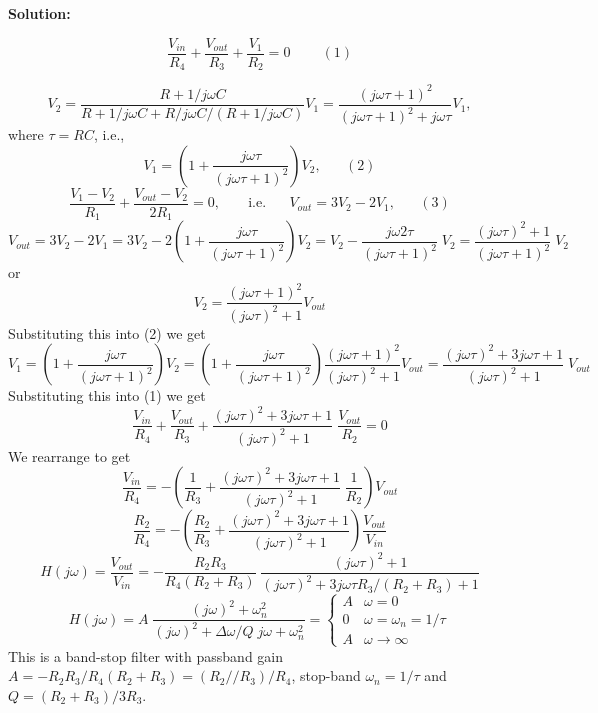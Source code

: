 \begin{enumerate}
  {\bf Solution:}

  \[
  \frac{V_{in}}{R_4}+\frac{V_{out}}{R_3}+\frac{V_1}{R_2}=0\;\;\;\;\;\;\;\;(1)
  \]

  \[
  V_2=\frac{R+1/j\omega C}{R+1/j\omega C+R/j\omega C/(R+1/j\omega C)}V_1
  =\frac{(j\omega\tau+1)^2}{(j\omega\tau+1)^2+j\omega\tau}V_1,
  \]
  where $\tau=RC$, i.e., 
  \[
  V_1=\left(1+\frac{j\omega\tau}{(j\omega\tau+1)^2}\right)V_2,\;\;\;\;\;\;(2)
  \]
  \[
  \frac{V_1-V_2}{R_1}+\frac{V_{out}-V_2}{2R_1}=0,
  \;\;\;\;\;\;\;\mbox{i.e.}\;\;\;\;\;\; V_{out}=3V_2-2V_1,\;\;\;\;\;\;(3)
  \]
  \[
  V_{out}=3V_2-2V_1=3V_2-2\left(1+\frac{j\omega\tau}{(j\omega\tau+1)^2}\right)V_2
  =V_2-\frac{j\omega 2\tau}{(j\omega\tau+1)^2}\;V_2
  =\frac{(j\omega\tau)^2+1}{(j\omega\tau+1)^2}\;V_2
  \]
  or 
  \[
  V_2=\frac{(j\omega\tau+1)^2}{(j\omega\tau)^2+1}V_{out}
  \]
  Substituting this into (2) we get 
  \[
  V_1=\left(1+\frac{j\omega\tau}{(j\omega\tau+1)^2}\right)V_2
  =\left(1+\frac{j\omega\tau}{(j\omega\tau+1)^2}\right)\frac{(j\omega\tau+1)^2}{(j\omega\tau)^2+1}V_{out}
  =\frac{(j\omega\tau)^2+3j\omega\tau+1}{(j\omega\tau)^2+1}\;V_{out}
  \]
  Substituting this into (1) we get 
  \[
  \frac{V_{in}}{R_4}+\frac{V_{out}}{R_3}
  +\frac{(j\omega\tau)^2+3j\omega\tau+1}{(j\omega\tau)^2+1}\;\frac{V_{out}}{R_2}=0
  \]
  We rearrange to get
  \[
  \frac{V_{in}}{R_4}=-\left(\frac{1}{R_3}
  +\frac{(j\omega\tau)^2+3j\omega\tau+1}{(j\omega\tau)^2+1}\;\frac{1}{R_2}\right)V_{out}
  \]
  \[
  \frac{R_2}{R_4}=-\left(\frac{R_2}{R_3}
  +\frac{(j\omega\tau)^2+3j\omega\tau+1}{(j\omega\tau)^2+1}\right)
  \frac{V_{out}}{V_{in}}
  \]
  \[
  H(j\omega)=\frac{V_{out}}{V_{in}}
  =-\frac{R_2R_3}{R_4(R_2+R_3)}\;\frac{(j\omega\tau)^2+1}{(j\omega\tau)^2+3j\omega\tau R_3/(R_2+R_3)+1}
  \]
  \[
  H(j\omega)=A\;\frac{(j\omega)^2+\omega_n^2}{(j\omega)^2+\Delta\omega/Q\;j\omega+\omega_n^2}
  =\left\{\begin{array}{ll}A&\omega=0\\0&\omega=\omega_n=1/\tau
  \\A&\omega\rightarrow\infty\end{array}\right.
  \]
  This is a band-stop filter with passband gain $A=-R_2R_3/R_4(R_2+R_3)=(R_2//R_3)/R_4$,
  stop-band $\omega_n=1/\tau$ and $Q=(R_2+R_3)/3R_3$.






\end{enumerate}
